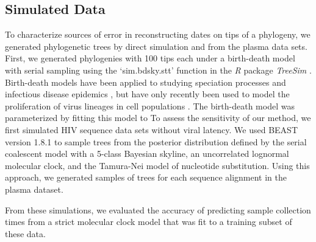 \documentclass[12pt]{article}
\begin{document}
\subsection * {Simulated Data} \label{subsec:simdata}


To characterize sources of error in reconstructing dates on tips of a phylogeny, we generated phylogenetic trees by direct simulation and from the plasma data sets.
First, we generated phylogenies with 100 tips each under a birth-death model with serial sampling using the `sim.bdsky.stt' function in the \textit{R} package \textit{TreeSim} \citep{Boskova14}.
Birth-death models have been applied to studying speciation processes \citep{Nee:2006} and infectious disease epidemics \citep{Stradler13}, but have only recently been used to model the proliferation of virus lineages in cell populations \citep{Hartfield:2015}.
The birth-death model was parameterized by fitting this model to 
To assess the sensitivity of our method, we first simulated HIV sequence data sets without viral latency.
We used BEAST version 1.8.1 to sample trees from the posterior distribution defined by the serial coalescent model with a 5-class Bayesian skyline, an uncorrelated lognormal molecular clock, and the Tamura-Nei model of nucleotide substitution.
Using this approach, we generated samples of trees for each sequence alignment in the plasma dataset.


From these simulations, we evaluated the accuracy of predicting sample collection times from a strict molecular clock model that was fit to a training subset of these data. 
\end{document}
